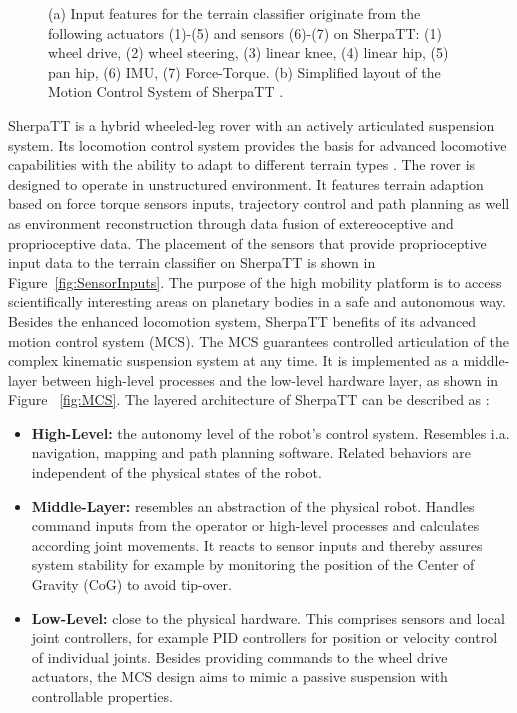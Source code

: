 \begin{figure}[!htbp]
{       }
   \caption{\label{fig:Loco}(a) Input features for the terrain classifier originate from the following actuators (1)-(5) and sensors (6)-(7) on SherpaTT: (1) wheel drive, (2) wheel steering, (3) linear knee, (4) linear hip, (5) pan hip, (6) IMU, (7) Force-Torque. (b) Simplified layout of the Motion Control System of SherpaTT \citep{cordes_phd_2018}.}
\end{figure}

SherpaTT is a hybrid wheeled-leg rover with an actively articulated suspension system. Its locomotion control system provides the basis for advanced locomotive capabilities with the ability to adapt to different terrain types \citep{cordes2018}. The rover is designed to operate in unstructured environment. It features terrain adaption based on force torque sensors inputs, trajectory control and path planning as well as environment reconstruction through data fusion of extereoceptive and proprioceptive data. The placement of the sensors that provide proprioceptive input data to the terrain classifier on SherpaTT is shown in Figure~\ref{fig:SensorInputs}. The purpose of the high mobility platform is to access scientifically interesting areas on planetary bodies in a safe and autonomous way. Besides the enhanced locomotion system, SherpaTT benefits of its advanced motion control system (MCS). The MCS guarantees controlled articulation of the complex kinematic suspension system at any time. It is implemented as a middle-layer between high-level processes and the low-level hardware layer, as shown in Figure ~\ref{fig:MCS}. The layered architecture of SherpaTT can be described as \citep{cordes2018}:

\begin{itemize}
    \item \textbf{High-Level:} the autonomy level of the robot’s control system. Resembles i.a. navigation, mapping and path planning software. Related behaviors are independent of the physical states of the robot.
    \item \textbf{Middle-Layer:} resembles an abstraction of the physical robot. Handles command inputs from the operator or high-level processes and calculates according joint movements. It reacts to sensor inputs and thereby assures system stability for example by monitoring the position of the Center of Gravity (CoG) to avoid tip-over.
    \item \textbf{Low-Level:} close to the physical hardware. This comprises sensors and local joint controllers, for example PID controllers for position or velocity control of individual joints. Besides providing commands to the wheel drive actuators, the MCS design aims to mimic a passive suspension with controllable properties.
\end{itemize}

